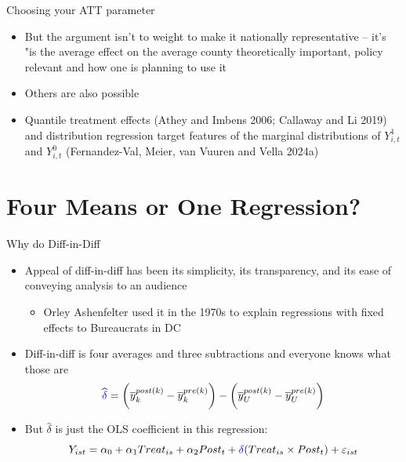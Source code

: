 \documentclass{beamer}
\begin{document}
\begin{frame}{Choosing your ATT parameter}

\begin{itemize}
\item But the argument isn't to weight to make it nationally representative -- it's "is the average effect on the average county theoretically important, policy relevant and how one is planning to use it
\item Others are also possible
\item Quantile treatment effects (Athey and Imbens 2006; Callaway and Li 2019) and distribution regression target features of the marginal distributions of $Y^1_{i,t}$ and $Y^0_{i,t}$ (Fernandez-Val, Meier, van Vuuren and Vella 2024a)
\end{itemize}

\end{frame}

\section{Four Means or One Regression?}




\begin{frame}{Why do Diff-in-Diff}

\begin{itemize}
\item Appeal of diff-in-diff has been its simplicity, its transparency, and its ease of conveying analysis to an audience
	\begin{itemize}
	\item Orley Ashenfelter used it in the 1970s to explain regressions with fixed effects to Bureaucrats in DC
	\end{itemize}
\item Diff-in-diff is four averages and three subtractions and everyone knows what those are
$$\widehat{\textcolor{blue}{\delta}} = \bigg ( \overline{y}_k^{post(k)} - \overline{y}_k^{pre(k)} \bigg ) - \bigg ( \overline{y}_U^{post(k)} - \overline{y}_U^{pre(k)} \bigg ) $$
\item But $\widehat{\delta}$ is just the OLS coefficient in this regression:
$$Y_{ist} = \alpha_0 + \alpha_1 Treat_{is} + \alpha_2 Post_{t} + \textcolor{blue}{\delta} (Treat_{is} \times Post_t) + \varepsilon_{ist} $$
\end{itemize}

\end{frame}
\end{document}
